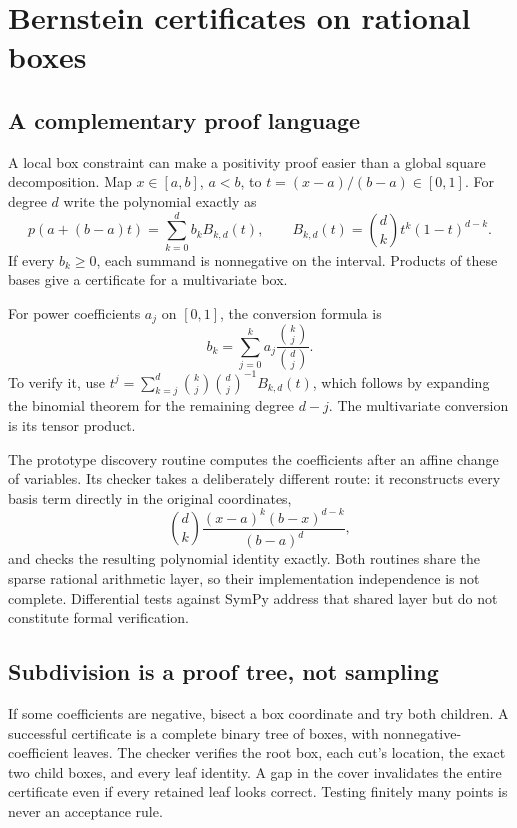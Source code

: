 \documentclass[11pt,a4paper]{article}
\begin{document}
\section{Bernstein certificates on rational boxes}

\subsection{A complementary proof language}

A local box constraint can make a positivity proof easier than a global
square decomposition. Map $x\in[a,b]$, $a<b$, to $t=(x-a)/(b-a)\in[0,1]$.
For degree $d$ write the polynomial exactly as
\[
 p(a+(b-a)t)=\sum_{k=0}^{d} b_k B_{k,d}(t),\qquad
 B_{k,d}(t)=\binom{d}{k}t^k(1-t)^{d-k}.
\]
If every $b_k\geq0$, each summand is nonnegative on the interval. Products of
these bases give a certificate for a multivariate box.

For power coefficients $a_j$ on $[0,1]$, the conversion formula is
\[
 b_k=\sum_{j=0}^{k}a_j\frac{\binom{k}{j}}{\binom{d}{j}}.
\]
To verify it, use
$t^j=\sum_{k=j}^{d}\binom{k}{j}\binom{d}{j}^{-1}B_{k,d}(t)$,
which follows by expanding the binomial theorem for the remaining degree
$d-j$. The multivariate conversion is its tensor product.

The prototype discovery routine computes the coefficients after an affine
change of variables. Its checker takes a deliberately different route:
it reconstructs every basis term directly in the original coordinates,
\[
 \binom{d}{k}\frac{(x-a)^k(b-x)^{d-k}}{(b-a)^d},
\]
and checks the resulting polynomial identity exactly. Both routines share the
sparse rational arithmetic layer, so their implementation independence is not
complete. Differential tests against SymPy address that shared layer but do
not constitute formal verification.

\subsection{Subdivision is a proof tree, not sampling}

If some coefficients are negative, bisect a box coordinate and try both
children. A successful certificate is a complete binary tree of boxes, with
nonnegative-coefficient leaves. The checker verifies the root box, each cut's
location, the exact two child boxes, and every leaf identity. A gap in the
cover invalidates the entire certificate even if every retained leaf looks
correct. Testing finitely many points is never an acceptance rule.
\end{document}
